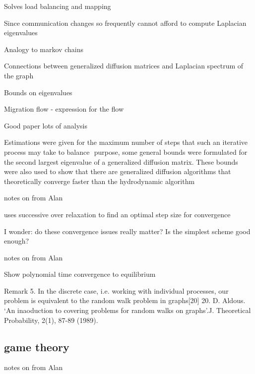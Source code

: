 \documentclass{article}
\begin{document}
Solves load balancing and mapping

Since communication changes so frequently cannot afford to compute Laplacian eigenvalues

Analogy to markov chains

Connections between generalized diffusion matrices and Laplacian spectrum of the graph

Bounds on eigenvalues

Migration flow - expression for the flow

Good paper lots of analysis


Estimations were given for the maximum number of steps that such an iterative process may take to balance
 purpose, some general bounds were formulated for the second largest eigenvalue of a generalized diffusion matrix. These bounds were also used to show that there are generalized diffusion algorithms that theoretically converge faster than the hydrodynamic algorithm 



\medskip

notes on
\cite{10.2307/2584287}
from Alan


uses successive over relaxation to find an optimal step size for convergence

I wonder: do these convergence issues really matter?  Is the simplest scheme good enough?


\medskip

notes on
\cite{Boillat:1990:LBP:95324.95326}
from Alan

Show polynomial time convergence to equilibrium

Remark 5. In the discrete case, i.e. working with individual processes, our problem is equivalent to the random walk problem in graphs[20] 
20. D. Aldous. ‘An inaoduction to covering problems for random walks on graphs’.J. Theoretical 
Probability, 2(1), 87-89 (1989).






\subsection{game theory}

\cite{GROSU20051022}
\cite{doi:10.1142/S0219198902000574}
\cite{7967109}
\cite{BELIKOVETSKY201616}
\cite{BARAM2014241}



\medskip

notes on
\cite{GROSU20051022}
from Alan
\end{document}
